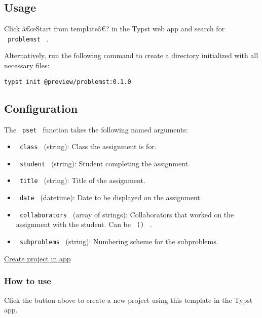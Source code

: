 
\subsection{Usage}\label{usage}

Click â€œStart from templateâ€? in the Typst web app and search for
\texttt{\ problemst\ } .

Alternatively, run the following command to create a directory
initialized with all necessary files:

\begin{verbatim}
typst init @preview/problemst:0.1.0
\end{verbatim}

\subsection{Configuration}\label{configuration}

The \texttt{\ pset\ } function takes the following named arguments:

\begin{itemize}
\tightlist
\item
  \texttt{\ class\ } (string): Class the assignment is for.
\item
  \texttt{\ student\ } (string): Student completing the assignment.
\item
  \texttt{\ title\ } (string): Title of the assignment.
\item
  \texttt{\ date\ } (datetime): Date to be displayed on the assignment.
\item
  \texttt{\ collaborators\ } (array of strings): Collaborators that
  worked on the assignment with the student. Can be \texttt{\ ()\ } .
\item
  \texttt{\ subproblems\ } (string): Numbering scheme for the
  subproblems.
\end{itemize}

\href{/app?template=problemst&version=0.1.0}{Create project in app}

\subsubsection{How to use}\label{how-to-use}

Click the button above to create a new project using this template in
the Typst app.

